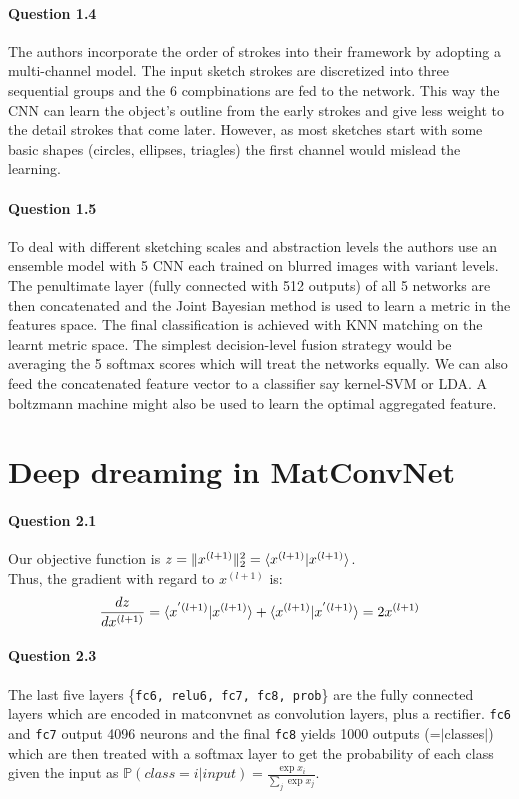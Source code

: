 \documentclass[10pt]{article}
\begin{document}
	\paragraph{Question 1.4} The authors incorporate the order of strokes into their framework by adopting a multi-channel model. The input sketch strokes are discretized into three sequential groups and the 6 compbinations are fed to the network. This way the CNN can learn the object's outline from the early strokes and give less weight to the detail strokes that come later. However, as most sketches start with some basic shapes (circles, ellipses, triagles) the first channel would mislead the learning.

	\paragraph{Question 1.5} To deal with different sketching scales and abstraction levels the authors use an ensemble model with 5 CNN each trained on blurred images with variant levels. The penultimate layer (fully connected with 512 outputs) of all 5 networks are then concatenated and the Joint Bayesian method is used to learn a metric in the features space. The final classification is achieved with KNN matching on the learnt metric space. The simplest decision-level fusion strategy would be averaging the 5 softmax scores which will treat the networks equally. We can also feed the concatenated feature vector to a classifier say kernel-SVM or LDA. A boltzmann machine might also be used to learn the optimal aggregated feature.

\section{Deep dreaming in MatConvNet }
	\paragraph{Question 2.1}
	Our objective function is $z=\|x^{(l+1)}\|_2^2=\braket{x^{(l+1)}|x^{(l+1)}}$.\\
	Thus, the gradient with regard to $x^{(l+1)}$ is:
	\[\frac{dz}{dx^{(l+1)}}=\braket{x^{'(l+1)}|x^{(l+1)}}+\braket{x^{(l+1)}|x^{'(l+1)}}=2x^{(l+1)}\]

	\paragraph{Question 2.3} The last five layers \{\texttt{fc6, relu6, fc7, fc8, prob}\} are the fully connected layers which are encoded in matconvnet as convolution layers, plus a rectifier. \texttt{fc6} and \texttt{fc7} output 4096 neurons and the final \texttt{fc8} yields 1000 outputs (=$|$classes$|$) which are then treated with a softmax layer to get the probability of each class given the input as $\mathbb P(class=i|input)=\frac{\exp{x_i}}{\sum_{j}\exp{x_j}}$.
\end{document}
